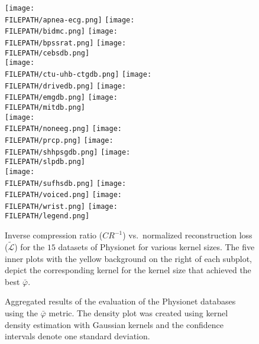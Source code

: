 \documentclass[journal]{IEEEtran}
\providecommand{\FILEPATH}{~/github.com/pbizopoulos/sparsely-activated-networks/packages/python/tmp}
\begin{document}
\begin{figure*}[!t]
  \texttt{[image: \\FILEPATH/apnea-ecg.png]}
  \texttt{[image: \\FILEPATH/bidmc.png]}
  \texttt{[image: \\FILEPATH/bpssrat.png]}
  \texttt{[image: \\FILEPATH/cebsdb.png]}
  \\
  \texttt{[image: \\FILEPATH/ctu-uhb-ctgdb.png]}
  \texttt{[image: \\FILEPATH/drivedb.png]}
  \texttt{[image: \\FILEPATH/emgdb.png]}
  \texttt{[image: \\FILEPATH/mitdb.png]}
  \\
  \texttt{[image: \\FILEPATH/noneeg.png]}
  \texttt{[image: \\FILEPATH/prcp.png]}
  \texttt{[image: \\FILEPATH/shhpsgdb.png]}
  \texttt{[image: \\FILEPATH/slpdb.png]}
  \\
  \texttt{[image: \\FILEPATH/sufhsdb.png]}
  \texttt{[image: \\FILEPATH/voiced.png]}
  \texttt{[image: \\FILEPATH/wrist.png]}
  \texttt{[image: \\FILEPATH/legend.png]}
  \caption{Inverse compression ratio ($CR^{-1}$) vs.\ normalized reconstruction loss ($\tilde{\mathcal{L}}$) for the $15$ datasets of Physionet for various kernel sizes.
  The five inner plots with the yellow background on the right of each subplot, depict the corresponding kernel for the kernel size that achieved the best $\bar\varphi$.}\label{fig:crrl}
\end{figure*}

\begin{figure*}[!t]
  \centering
  \caption{Aggregated results of the evaluation of the Physionet databases using the $\bar\varphi$ metric.
  The density plot was created using kernel density estimation with Gaussian kernels and the confidence intervals denote one standard deviation.}\label{fig:flithos}
\end{figure*}
\end{document}
